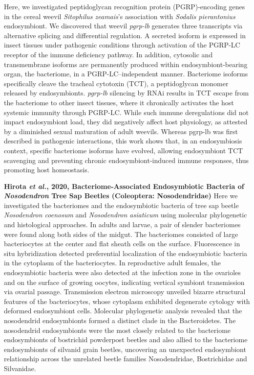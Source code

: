 \documentclass[11pt]{article}
\begin{document}
\begin{sloppypar}
Here, we investigated peptidoglycan recognition protein (PGRP)-encoding genes in the cereal weevil \textit{Sitophilus zeamais}’s association with \textit{Sodalis pierantonius} endosymbiont. 
We discovered that weevil \textit{pgrp-lb} generates three transcripts via alternative splicing and differential regulation. 
A secreted isoform is expressed in insect tissues under pathogenic conditions through activation of the PGRP-LC receptor of the immune deficiency pathway. 
In addition, cytosolic and transmembrane isoforms are permanently produced within endosymbiont-bearing organ, the bacteriome, in a PGRP-LC–independent manner. 
Bacteriome isoforms specifically cleave the tracheal cytotoxin (TCT), a peptidoglycan monomer released by endosymbionts. 
\textit{pgrp-lb} silencing by RNAi results in TCT escape from the bacteriome to other insect tissues, where it chronically activates the host systemic immunity through PGRP-LC. 
While such immune deregulations did not impact endosymbiont load, they did negatively affect host physiology, as attested by a diminished sexual maturation of adult weevils. 
Whereas pgrp-lb was first described in pathogenic interactions, this work shows that, in an endosymbiosis context, specific bacteriome isoforms have evolved, allowing endosymbiont TCT scavenging and preventing chronic endosymbiont-induced immune responses, thus promoting host homeostasis.
\par
\textbf{Hirota \textit{et al.}, 2020, Bacteriome-Associated Endosymbiotic Bacteria of \textit{Nosodendron} Tree Sap Beetles (Coleoptera: Nosodendridae)}
Here we investigated the bacteriomes and the endosymbiotic bacteria of tree sap beetle \textit{Nosodendron coenosum} and \textit{Nosodendron asiaticum} using molecular phylogenetic and histological approaches. 
In adults and larvae, a pair of slender bacteriomes were found along both sides of the midgut. 
The bacteriomes consisted of large bacteriocytes at the center and flat sheath cells on the surface. 
Fluorescence in situ hybridization detected preferential localization of the endosymbiotic bacteria in the cytoplasm of the bacteriocytes. 
In reproductive adult females, the endosymbiotic bacteria were also detected at the infection zone in the ovarioles and on the surface of growing oocytes, indicating vertical symbiont transmission via ovarial passage. 
Transmission electron microscopy unveiled bizarre structural features of the bacteriocytes, whose cytoplasm exhibited degenerate cytology with deformed endosymbiont cells. 
Molecular phylogenetic analysis revealed that the nosodendrid endosymbionts formed a distinct clade in the Bacteroidetes. 
The nosodendrid endosymbionts were the most closely related to the bacteriome endosymbionts of bostrichid powderpost beetles and also allied to the bacteriome endosymbionts of silvanid grain beetles, uncovering an unexpected endosymbiont relationship across the unrelated beetle families Nosodendridae, Bostrichidae and Silvanidae.

\end{sloppypar}
\end{document}
